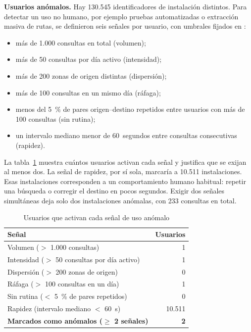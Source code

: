 \textbf{Usuarios anómalos.} Hay 130.545 identificadores de instalación distintos. Para
detectar un uso no humano, por ejemplo pruebas automatizadas o extracción masiva de
rutas, se definieron seis señales por usuario, con umbrales fijados en :
\begin{itemize}
  \item más de 1.000 consultas en total (volumen);
  \item más de 50 consultas por día activo (intensidad);
  \item más de 200 zonas de origen distintas (dispersión);
  \item más de 100 consultas en un mismo día (ráfaga);
  \item menos del 5~\% de pares origen--destino repetidos entre usuarios con más de 100
        consultas (sin rutina);
  \item un intervalo mediano menor de 60~segundos entre consultas consecutivas (rapidez).
\end{itemize}

La tabla~\ref{tab:senales-usuario} muestra cuántos usuarios activan cada señal y justifica
que se exijan al menos dos. La señal de rapidez, por sí sola, marcaría a 10.511
instalaciones. Esas instalaciones corresponden a un comportamiento humano habitual:
repetir una búsqueda o corregir el destino en pocos segundos. Exigir dos señales
simultáneas deja solo dos instalaciones anómalas, con 233 consultas en total.

\begin{table}[H]
  \centering
  \caption{Usuarios que activan cada señal de uso anómalo}
  \label{tab:senales-usuario}
  \interlineadoSimple
  \small
  \begin{tabular}{@{}lr@{}}
    \toprule
    \textbf{Señal} & \textbf{Usuarios} \\
    \midrule
    Volumen ($>$ 1.000 consultas) & 1 \\
    Intensidad ($>$ 50 consultas por día activo) & 1 \\
    Dispersión ($>$ 200 zonas de origen) & 0 \\
    Ráfaga ($>$ 100 consultas en un día) & 1 \\
    Sin rutina ($<$ 5~\% de pares repetidos) & 0 \\
    Rapidez (intervalo mediano $<$ 60~s) & 10.511 \\
    \midrule
    \textbf{Marcados como anómalos ($\geq$ 2 señales)} & \textbf{2} \\
    \bottomrule
  \end{tabular}
\end{table}

